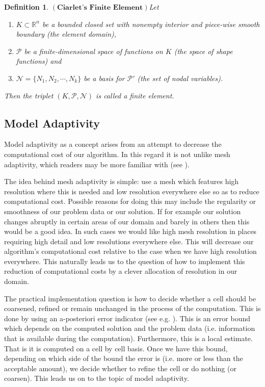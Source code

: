 \documentclass[12pt,a4paper]{article}
\newtheorem{definition}[theorem]{Definition}
\theoremstyle{definition}
\begin{document}
\begin{definition}{$\left(\textbf{Ciarlet's Finite Element}\right)$}\label{defn_finite-element}
	Let
\begin{enumerate}
\item $K\subset \mathbb{R}^n$ be a bounded closed set with nonempty interior and piece-wise smooth boundary (the element domain),
\item $\mathcal{P}$ be a finite-dimensional space of functions on $K$ (the space of shape functions) and
\item $\mathcal{N}=\lbrace N_1,N_2,\cdots,N_k \rbrace$ be a basis for $\mathcal{P}'$ (the set of nodal variables).
\end{enumerate}
Then the triplet $\left(K,\mathcal{P},\mathcal{N}\right)$ is called a finite element.
\end{definition}


\subsection{Model Adaptivity}
Model adaptivity as a concept arises from an attempt to decrease the computational cost of our algorithm.  In this regard it is not unlike mesh adaptivity, which readers may be more familiar with (see \cite{ern2013theory}).   

The idea behind mesh adaptivity is simple: use a mesh which features high resolution  where this is needed and low resolution everywhere else so as to reduce computational cost.  Possible reasons for doing this may include the regularity or smoothness of our problem data or our solution.  If for example our solution changes abruptly in certain areas of our domain and barely in others then this would be a good idea.  In such cases we would like high mesh resolution in places requiring high detail and low resolutions everywhere else.  This will decrease our algorithm's computational cost relative to the case when we have high resolution everywhere.  This naturally leads us to the question of how to implement this reduction of computational costs by a clever allocation of resolution in our domain.

The practical implementation question is how to decide whether a cell should be coarsened, refined or remain unchanged in the process of the computation.  This is done by using an a-posteriori error indicator (see e.g. \cite{braess2007finite}).  This is an error bound which depends on the computed solution and the problem data (i.e. information that is available during the computation).  Furthermore, this is a local estimate.  That is it is computed on a cell by cell basis.  Once we have this bound, depending on which side of the bound the error is (i.e. more or less than the acceptable amount),  we decide whether to refine the cell or do nothing (or coarsen).  This leads us on to the topic of model adaptivity.
\end{document}
